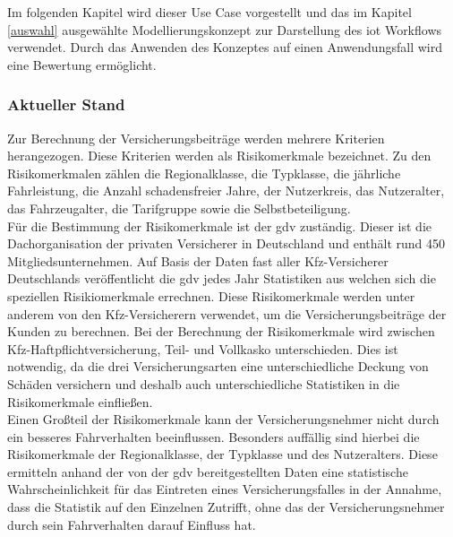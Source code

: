 \documentclass[a4paper, 12pt, twoside, headsepline=true]{scrartcl} %
\begin{document}
Im folgenden Kapitel wird dieser Use Case vorgestellt und das im Kapitel \ref{auswahl} ausgewählte Modellierungskonzept zur Darstellung des \ac{iot} Workflows verwendet. Durch das Anwenden des Konzeptes auf einen Anwendungsfall wird eine Bewertung ermöglicht.

\subsubsection{Aktueller Stand}
Zur Berechnung der Versicherungsbeiträge werden mehrere Kriterien herangezogen. Diese Kriterien werden als Risikomerkmale bezeichnet. Zu den Risikomerkmalen zählen die Regionalklasse, die Typklasse, die jährliche Fahrleistung, die Anzahl schadensfreier Jahre, der Nutzerkreis, das Nutzeralter, das Fahrzeugalter, die Tarifgruppe sowie die Selbstbeteiligung. \\
Für die Bestimmung der Risikomerkmale ist der \ac{gdv} zuständig. Dieser ist die Dachorganisation der privaten Versicherer in Deutschland und enthält rund 450 Mitgliedsunternehmen. Auf Basis der Daten fast aller Kfz-Versicherer Deutschlands veröffentlicht die \ac{gdv} jedes Jahr Statistiken aus welchen sich die speziellen Risikiomerkmale errechnen. Diese Risikomerkmale werden unter anderem von den Kfz-Versicherern
verwendet, um die Versicherungsbeiträge der Kunden zu berechnen. Bei der Berechnung der Risikomerkmale wird zwischen Kfz-Haftpflichtversicherung, Teil- und Vollkasko unterschieden. Dies ist notwendig, da die drei Versicherungsarten eine unterschiedliche Deckung von Schäden versichern und deshalb auch unterschiedliche Statistiken in die Risikomerkmale einfließen. \\
Einen Großteil der Risikomerkmale kann der Versicherungsnehmer nicht durch ein besseres Fahrverhalten beeinflussen. Besonders auffällig sind hierbei die Risikomerkmale der Regionalklasse, der Typklasse und des Nutzeralters. Diese ermitteln anhand der von der \ac{gdv} bereitgestellten Daten eine statistische Wahrscheinlichkeit für das Eintreten eines Versicherungsfalles in der Annahme, dass die Statistik auf den Einzelnen Zutrifft, ohne das der Versicherungsnehmer durch sein Fahrverhalten darauf Einfluss hat\cite{kfzversicherung}. 
\end{document}

